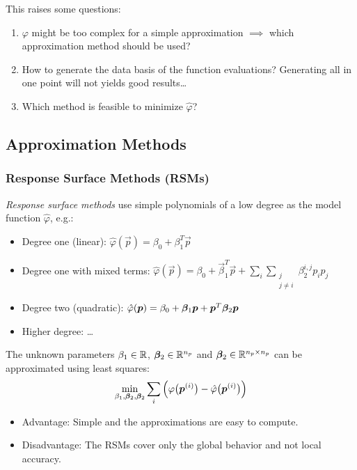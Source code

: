 		This raises some questions:
		\begin{enumerate}
			\item \(\varphi\) might be too complex for a simple approximation \(\implies\) which approximation method should be used?
			\item How to generate the data basis of the function evaluations? Generating all in one point will not yields good results\dots
			\item Which method is feasible to minimize \(\hat{\varphi}\)?
		\end{enumerate}

		\subsection{Approximation Methods}
			\subsubsection{Response Surface Methods (RSMs)}
				\emph{Response surface methods} use simple polynomials of a low degree as the model function \(\hat{\varphi}\), e.g.:
				\begin{itemize}
					\item Degree one (linear): \tabto{5.5cm} \( \hat{\varphi}(\vec{p}) = \beta_0 + \beta_1^T \vec{p} \)
					\item Degree one with mixed terms: \tabto{5.5cm} \( \hat{\varphi}(\vec{p}) = \beta_0 + \vec{\beta}_1^T \vec{p} + \sum_{i} \sum_{\substack{j \\ j \neq i}} \beta_2^{i, j} p_i p_j \)
					\item Degree two (quadratic): \tabto{5.5cm} \( \hat{\varphi}(\bm{p}) = \beta_0 + \bm{\beta}_1 \bm{p} + \bm{p}^T \bm{\beta}_2 \bm{p} \)
					\item Higher degree: \dots
				\end{itemize}
				The unknown parameters \( \beta_1 \in \mathbb{R} \), \( \bm{\beta}_2 \in \mathbb{R}^{n_p} \) and \( \bm{\beta}_2 \in \mathbb{R}^{n_p \times n_p} \) can be approximated using least squares:
				\begin{align*}
					\min_{\beta_1, \bm{\beta}_2, \bm{\beta}_2} \sum_i \Big( \varphi\big(\bm{p}^{(i)}\big) - \hat{\varphi}\big(\bm{p}^{(i)}\big) \Big)
				\end{align*}

				\begin{itemize}
					\item Advantage: Simple and the approximations are easy to compute.
					\item Disadvantage: The RSMs cover only the global behavior and not local accuracy.
				\end{itemize}

